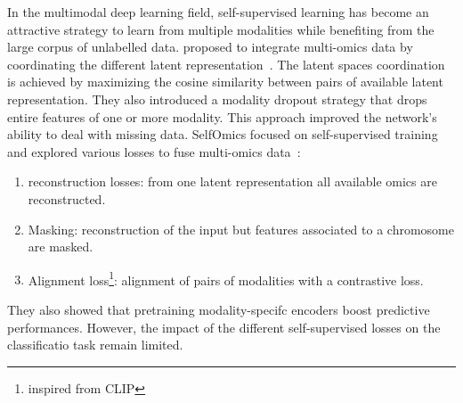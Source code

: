 \documentclass[../main.tex]{subfiles}
\begin{document}
			In the multimodal deep learning field, self-supervised learning has become an attractive strategy to learn from multiple modalities while benefiting from the large corpus of unlabelled data. 
			\citeauthor{Cheerla2019} proposed to integrate multi-omics data by coordinating the different latent representation~\cite{Cheerla2019}. 
			The latent spaces coordination is achieved by maximizing the cosine similarity between pairs of available latent representation.  
			They also introduced a modality dropout strategy that drops entire features of one or more modality. 
			This approach improved the network’s ability to deal with missing data.
			SelfOmics focused on self-supervised training and explored various losses to fuse multi-omics data~\cite{selfOmics}: 
			\begin{enumerate}[nosep]
				\item reconstruction losses: from one latent representation all available omics are reconstructed. 
				\item Masking: reconstruction of the input but features associated to a chromosome are masked. 
				\item Alignment loss\footnote{inspired from CLIP}: alignment of pairs of modalities with a contrastive loss. 
			\end{enumerate}
			They also showed that pretraining modality-specifc encoders boost predictive performances. 
			However, the impact of the different self-supervised losses on the classificatio task remain limited. 
\end{document}
